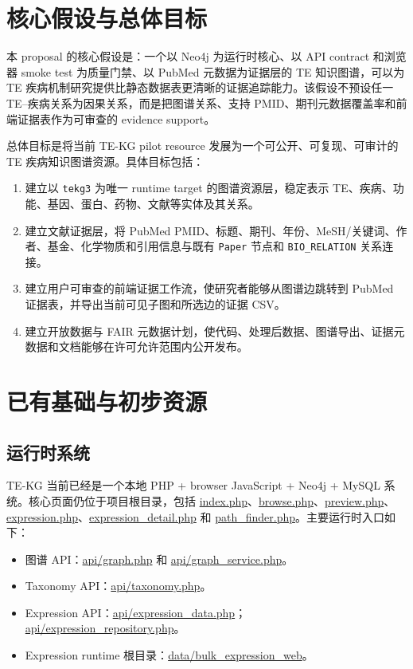 \documentclass[12pt,a4paper,UTF8]{ctexart}
\begin{document}
\section{核心假设与总体目标}

本 proposal 的核心假设是：一个以 Neo4j 为运行时核心、以 API contract 和浏览器 smoke test 为质量门禁、以 PubMed 元数据为证据层的 TE 知识图谱，可以为 TE 疾病机制研究提供比静态数据表更清晰的证据追踪能力。该假设不预设任一 TE--疾病关系为因果关系，而是把图谱关系、支持 PMID、期刊元数据覆盖率和前端证据表作为可审查的 evidence support。

总体目标是将当前 TE-KG pilot resource 发展为一个可公开、可复现、可审计的 TE 疾病知识图谱资源。具体目标包括：

\begin{enumerate}
    \item 建立以 \texttt{tekg3} 为唯一 runtime target 的图谱资源层，稳定表示 TE、疾病、功能、基因、蛋白、药物、文献等实体及其关系。
    \item 建立文献证据层，将 PubMed PMID、标题、期刊、年份、MeSH/关键词、作者、基金、化学物质和引用信息与既有 \texttt{Paper} 节点和 \texttt{BIO\_RELATION} 关系连接。
    \item 建立用户可审查的前端证据工作流，使研究者能够从图谱边跳转到 PubMed 证据表，并导出当前可见子图和所选边的证据 CSV。
    \item 建立开放数据与 FAIR 元数据计划，使代码、处理后数据、图谱导出、证据元数据和文档能够在许可允许范围内公开发布\cite{wilkinson2016fair,springer_nature_data_policy}。
\end{enumerate}

\section{已有基础与初步资源}

\subsection{运行时系统}

TE-KG 当前已经是一个本地 PHP + browser JavaScript + Neo4j + MySQL 系统。核心页面仍位于项目根目录，包括 \url{index.php}、\url{browse.php}、\url{preview.php}、\url{expression.php}、\url{expression_detail.php} 和 \url{path_finder.php}。主要运行时入口如下：

\begin{itemize}
    \item 图谱 API：\url{api/graph.php} 和 \url{api/graph_service.php}。
    \item Taxonomy API：\url{api/taxonomy.php}。
    \item Expression API：\url{api/expression_data.php}；\\
          \url{api/expression_repository.php}。
    \item Expression runtime 根目录：\url{data/bulk_expression_web}。
\end{itemize}
\end{document}
